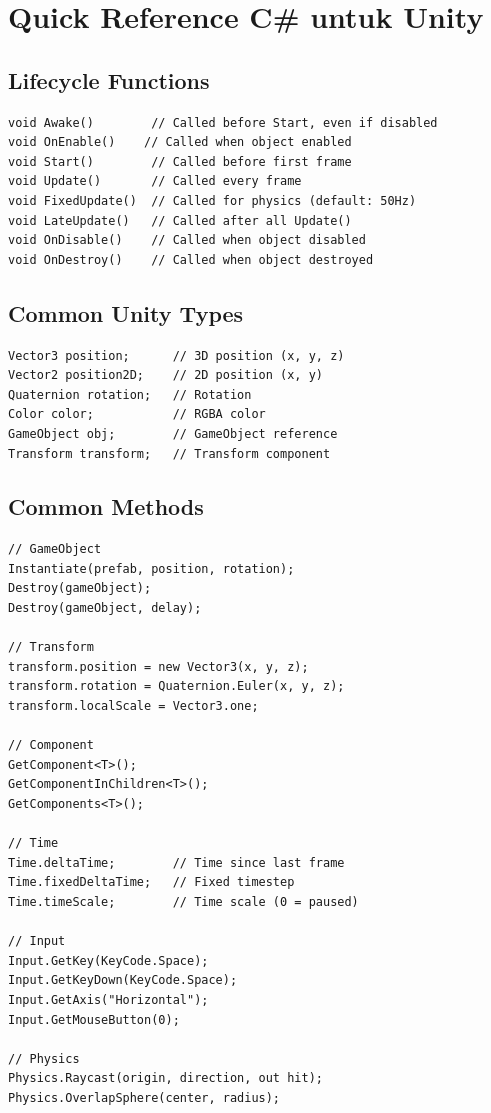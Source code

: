 
\chapter{Quick Reference C\# untuk Unity}

\section{Lifecycle Functions}

\begin{lstlisting}[language={[Sharp]C}]
void Awake()        // Called before Start, even if disabled
void OnEnable()    // Called when object enabled
void Start()        // Called before first frame
void Update()       // Called every frame
void FixedUpdate()  // Called for physics (default: 50Hz)
void LateUpdate()   // Called after all Update()
void OnDisable()    // Called when object disabled
void OnDestroy()    // Called when object destroyed
\end{lstlisting}

\section{Common Unity Types}

\begin{lstlisting}[language={[Sharp]C}]
Vector3 position;      // 3D position (x, y, z)
Vector2 position2D;    // 2D position (x, y)
Quaternion rotation;   // Rotation
Color color;           // RGBA color
GameObject obj;        // GameObject reference
Transform transform;   // Transform component
\end{lstlisting}

\section{Common Methods}

\begin{lstlisting}[language={[Sharp]C}]
// GameObject
Instantiate(prefab, position, rotation);
Destroy(gameObject);
Destroy(gameObject, delay);

// Transform
transform.position = new Vector3(x, y, z);
transform.rotation = Quaternion.Euler(x, y, z);
transform.localScale = Vector3.one;

// Component
GetComponent<T>();
GetComponentInChildren<T>();
GetComponents<T>();

// Time
Time.deltaTime;        // Time since last frame
Time.fixedDeltaTime;   // Fixed timestep
Time.timeScale;        // Time scale (0 = paused)

// Input
Input.GetKey(KeyCode.Space);
Input.GetKeyDown(KeyCode.Space);
Input.GetAxis("Horizontal");
Input.GetMouseButton(0);

// Physics
Physics.Raycast(origin, direction, out hit);
Physics.OverlapSphere(center, radius);
\end{lstlisting}

